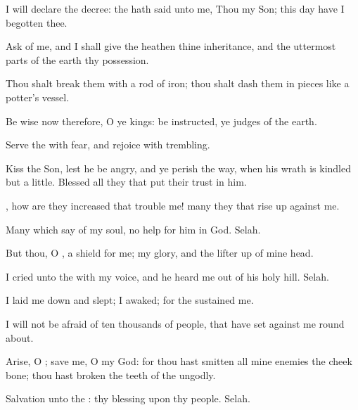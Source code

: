 {\Q {}I will
declare the
decree: the
{} hath
said unto me, Thou
{} my
Son; this
day have I
begotten thee.


\par }{\Q {}Ask of me, and I shall
give
{} the
heathen
{} thine
inheritance, and the uttermost
parts of the
earth
{} thy
possession.


\par }{\Q {}Thou shalt
break them with a
rod of
iron; thou shalt dash them in
pieces like a
potter’s
vessel.


\par }{\BB \par }
{\Q {}Be
wise now therefore, O ye
kings: be
instructed, ye
judges of the
earth.


\par }{\Q {}Serve the
{} with
fear, and
rejoice with
trembling.


\par }{\Q {}Kiss the
Son, lest he be
angry, and ye
perish
{} the
way, when his
wrath is
kindled but a
little.
Blessed
{} all they that put their
trust in him.




\par }
{\Q {}, how are they
increased that
trouble me!
many
{} they that rise
up against me.


\par }{\Q {}Many
{} which
say of my
soul,
{} no
help for him in
God.
Selah.


\par }{\Q {}But thou, O
{},
{} a
shield for me; my
glory, and the lifter
up of mine
head.


\par }{\BB \par }
{\Q {}I
cried unto the
{} with my
voice, and he
heard me out of his
holy
hill.
Selah.


\par }{\Q {}I laid me
down and
slept; I
awaked; for the
{}
sustained me.


\par }{\Q {}I will not be
afraid of ten
thousands of
people, that have
set
{} against me round
about.


\par }{\Q {}Arise, O
{};
save me, O my
God: for thou hast
smitten all mine
enemies
{} the cheek
bone; thou hast
broken the
teeth of the
ungodly.


\par }{\Q {}Salvation
{} unto the
{}: thy
blessing
{} upon thy
people.
Selah.




\par }
